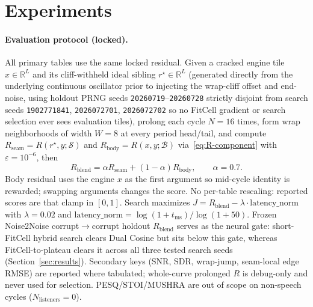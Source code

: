 \section{Experiments}
\label{sec:experiments}

\paragraph{Evaluation protocol (locked).}
\label{sec:eval-protocol}
All primary tables use the same locked residual.
Given a cracked engine tile $x\in\mathbb{R}^{L}$ and its cliff-withheld ideal sibling $r^{\star}\in\mathbb{R}^{L}$ (generated directly from the underlying continuous oscillator prior to injecting the wrap-cliff offset and end-noise, using holdout PRNG seeds \texttt{20260719}--\texttt{20260728} strictly disjoint from search seeds \texttt{1902771841}, \texttt{2026072701}, \texttt{2026072702} so no FitCell gradient or search selection ever sees evaluation tiles),
prolong each cycle $N{=}16$ times, form wrap neighborhoods of width $W{=}8$ at every period head/tail,
and compute $R_{\mathrm{seam}}=R(r^{\star},y;\mathcal{S})$ and $R_{\mathrm{body}}=R(x,y;\mathcal{B})$ via~\eqref{eq:R-component} with $\varepsilon=10^{-6}$, then
\[
R_{\mathrm{blend}}=\alpha R_{\mathrm{seam}}+(1-\alpha)R_{\mathrm{body}},\qquad\alpha{=}0.7.
\]
Body residual uses the engine $x$ as the first argument so mid-cycle identity is rewarded; swapping arguments changes the score.
No per-table rescaling: reported scores are that clamp in $[0,1]$.
Search maximizes
$J=R_{\mathrm{blend}}-\lambda\cdot\mathrm{latency\_norm}$ with $\lambda{=}0.02$ and
$\mathrm{latency\_norm}=\log(1{+}t_{\mathrm{ms}})/\log(1{+}50)$.
Frozen Noise2Noise corrupt$\to$corrupt holdout $R_{\mathrm{blend}}$ serves as the neural gate: short-FitCell hybrid search clears Dual Cosine but sits below this gate, whereas FitCell-to-plateau clears it across all three tested search seeds (Section~\ref{sec:results}).
Secondary keys (SNR, SDR, wrap-jump, seam-local edge RMSE) are reported where tabulated;
whole-curve prolonged $R$ is debug-only and never used for selection.
PESQ/STOI/MUSHRA are out of scope on non-speech cycles ($N_{\mathrm{listeners}}{=}0$).

